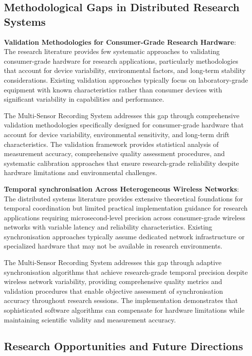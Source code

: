 \documentclass[11pt,a4paper]{report}
\begin{document}
\subsection{Methodological Gaps in Distributed Research Systems}

\noindent \textbf{Validation Methodologies for Consumer-Grade Research Hardware}: The research literature provides few systematic approaches to validating consumer-grade hardware for research applications, particularly methodologies that account for device variability, environmental factors, and long-term stability considerations. Existing validation approaches typically focus on laboratory-grade equipment with known characteristics rather than consumer devices with significant variability in capabilities and performance.

The Multi-Sensor Recording System addresses this gap through comprehensive validation methodologies specifically designed for consumer-grade hardware that account for device variability, environmental sensitivity, and long-term drift characteristics. The validation framework provides statistical analysis of measurement accuracy, comprehensive quality assessment procedures, and systematic calibration approaches that ensure research-grade reliability despite hardware limitations and environmental challenges.

\noindent \textbf{Temporal synchronisation Across Heterogeneous Wireless Networks}: The distributed systems literature provides extensive theoretical foundations for temporal coordination but limited practical implementation guidance for research applications requiring microsecond-level precision across consumer-grade wireless networks with variable latency and reliability characteristics. Existing synchronisation approaches typically assume dedicated network infrastructure or specialized hardware that may not be available in research environments.

The Multi-Sensor Recording System addresses this gap through adaptive synchronisation algorithms that achieve research-grade temporal precision despite wireless network variability, providing comprehensive quality metrics and validation procedures that enable objective assessment of synchronisation accuracy throughout research sessions. The implementation demonstrates that sophisticated software algorithms can compensate for hardware limitations while maintaining scientific validity and measurement accuracy.

\subsection{Research Opportunities and Future Directions}
\end{document}
